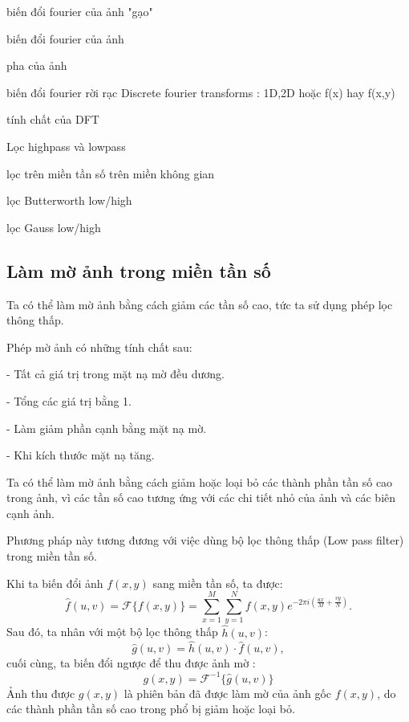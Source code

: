 \documentclass[12pt,a4paper]{report}
\numberwithin{equation}{section}
\theoremstyle{definition} %
\begin{document}
biến đổi fourier của ảnh "gạo"

biến đổi fourier của ảnh

pha của ảnh

biến đổi fourier rời rạc Discrete fourier transforms :  1D,2D hoặc f(x) hay f(x,y)

tính chất của DFT

Lọc highpass và lowpass

lọc trên miền tần số trên miền không gian

lọc Butterworth low/high

lọc Gauss low/high




\subsection{Làm mờ ảnh trong miền tần số}

Ta có thể làm mờ ảnh bằng cách giảm các tần số cao, tức ta sử dụng phép lọc thông thấp.

Phép mờ ảnh có những tính chất sau:

- Tất cả giá trị trong mặt nạ mờ đều dương.

- Tổng các giá trị bằng 1.

- Làm giảm phần cạnh bằng mặt nạ mờ.

- Khi kích thước mặt nạ tăng.

Ta có thể làm mờ ảnh bằng cách giảm hoặc loại bỏ các thành phần tần số cao trong ảnh, vì các tần số cao tương ứng với các chi tiết nhỏ của ảnh và các biên cạnh ảnh.

Phương pháp này tương đương với việc dùng bộ lọc thông thấp (Low pass filter) trong miền tần số.

Khi ta biến đổi ảnh $f(x,y)$ sang miền tần số, ta được: 
\begin{equation}
	\label{141}
	\hat{f}(u,v) = \mathcal{F}\{f(x,y)\} = \sum_{x=1}^{M}\sum_{y=1}^{N} f(x,y)e^{-2\pi i\left(\frac{ux}{M}+\frac{vy}{N}\right)}.
\end{equation}
Sau đó, ta nhân với một bộ lọc thông thấp $\hat{h}(u,v)$: 
\begin{equation}
\label{142}
\hat{g}(u,v) = \hat{h}(u,v)\cdot\hat{f}(u,v),
\end{equation}
cuối cùng, ta biến đổi ngược để thu được ảnh mờ : 
\begin{equation}
\label{143}
g(x,y) = \mathcal{F}^{-1}\{\hat{g}(u,v)\}
\end{equation}
Ảnh thu được $g(x,y)$ là phiên bản đã được làm mờ của ảnh gốc $f(x,y)$, do các thành phần tần số cao trong phổ bị giảm hoặc loại bỏ. 
\end{document}
